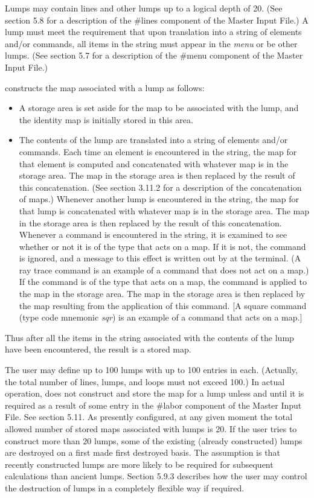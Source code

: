 Lumps may contain lines and other lumps up to a logical depth of 20. (See
section 5.8 for a description of the \#lines component of the Master Input
File.) A lump must meet the requirement that upon translation into a string
of elements and/or commands, all items in the string must appear in the
{\em menu} or be other lumps. (See section 5.7 for a description of the
\#menu component of the Master Input File.)

\Mary constructs the map associated with a lump as follows:
\begin{itemize} \item A storage area is set aside for the map to be
associated with the lump, and the identity map is initially stored in this
area. \item The contents of the lump are translated into a string of
elements and/or commands. Each time an element is encountered in the
string, the map for that element is computed and concatenated with whatever
map is in the storage area. The map in the storage area is then replaced by
the result of this concatenation. (See section 3.11.2 for a description of
the concatenation of maps.) Whenever another lump is encountered in the
string, the map for that lump is concatenated with whatever map is in the
storage area. The map in the storage area is then replaced by the result of
this concatenation. Whenever a command is encountered in the string, it is
examined to see whether or not it is of the type that acts on a map. If it
is not, the command is ignored, and a message to this effect is written out
by \Mary at the terminal. (A ray trace command is an example of a command
that does not act on a map.) If the command is of the type that acts on a
map, the command is applied to the map in the storage area. The map in the
storage area is then replaced by the map resulting from the application of
this command. [A square command (type code mnemonic {\em sqr}) is an
example of a command that acts on a map.]
\end{itemize} Thus after all the items in the string associated with the
contents of the lump have been encountered, the result is a stored map.

The user may define up to 100 lumps with up to 100 entries in each.
(Actually, the total number of lines, lumps, and loops must not exceed
100.) In actual operation, \Mary does not construct and store the map for a
lump unless and until it is required as a result of some entry in the
\#labor component of the Master Input File. See section 5.11. As presently
configured, at any given moment the total allowed number of stored maps
associated with lumps is 20. If the user tries to construct more than 20
lumps, some of the existing (already constructed) lumps are destroyed on a
first made first destroyed basis. The assumption is that recently
constructed lumps are more likely to be required for subsequent
calculations than ancient lumps. Section 5.9.3 describes how the user may
control the destruction of lumps in a completely flexible way if required.

